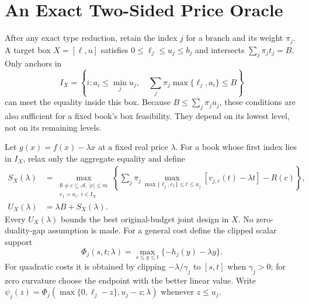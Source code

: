 \section{An Exact Two-Sided Price Oracle}\label{sec:r46-box}
After any exact type reduction, retain the index $j$ for a branch and its weight $\pi_j$. A target box $X=[\ell,u]$ satisfies $0\leq\ell_j\leq u_j\leq b_j$ and intersects $\sum_j\pi_jt_j=B$. Only anchors in
\begin{equation}\label{eq:r46-anchors}
 I_X=\left\{i:a_i\leq\min_j u_j,\quad
               \sum_j\pi_j\max\{\ell_j,a_i\}\leq B\right\}
\end{equation}
can meet the equality inside this box. Because $B\leq\sum_j\pi_ju_j$, these conditions are also sufficient for a fixed book's box feasibility. They depend on its lowest level, not on its remaining levels.

Let $g(x)=f(x)-\lambda x$ at a fixed real price $\lambda$. For a book whose first index lies in $I_X$, relax only the aggregate equality and define
\begin{align}
 S_X(\lambda)&=\max_{\substack{\emptyset\ne c\subseteq\mathcal A,\ |c|\leq m\\c_1=a_i,\ i\in I_X}}
 \left\{\sum_j\pi_j\max_{\max\{\ell_j,c_1\}\leq t\leq u_j}
       [v_{j,c}(t)-\lambda t]-R(c)\right\},\label{eq:r46-support}\\
 U_X(\lambda)&=\lambda B+S_X(\lambda).\label{eq:r46-upper}
\end{align}
Every $U_X(\lambda)$ bounds the best original-budget joint design in $X$. No zero-duality-gap assumption is made. For a general cost define the clipped scalar support
\[
 \Phi_j(s,t;\lambda)=\max_{s\leq y\leq t}\{-h_j(y)-\lambda y\}.
\]
For quadratic costs it is obtained by clipping $-\lambda/\gamma_j$ to $[s,t]$ when $\gamma_j>0$; for zero curvature choose the endpoint with the better linear value. Write
$\psi_j(z)=\Phi_j(\max\{0,\ell_j-z\},u_j-z;\lambda)$ whenever $z\leq u_j$.

